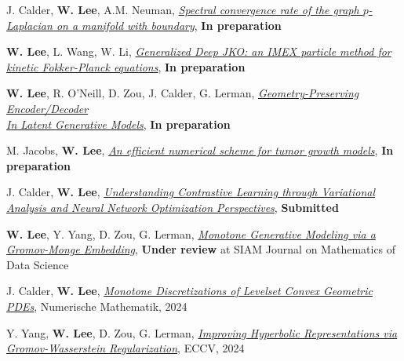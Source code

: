 

\begin{cvparagraph}

\vspace{0.5cm}
\begin{cvitems}
  \item J. Calder, \textbf{W. Lee}, A.M. Neuman, \href{}{\textit{Spectral convergence rate of the graph $p$-Laplacian on a manifold with boundary}}, \textbf{In preparation}
    \medskip
  \item \textbf{W. Lee}, L. Wang, W. Li, \href{}{\textit{Generalized Deep JKO: an IMEX particle method for kinetic Fokker-Planck equations}}, \textbf{In preparation}
  \medskip
  \item \textbf{W. Lee}, R. O'Neill, D. Zou, J. Calder, G. Lerman, \href{}{\textit{Geometry-Preserving Encoder/Decoder\\ In Latent Generative Models}}, \textbf{In preparation}
  \medskip
  \item M. Jacobs, \textbf{W. Lee}, \href{}{\textit{An efficient numerical scheme for tumor growth models}}, \textbf{In preparation}
    \medskip
  \item J. Calder, \textbf{W. Lee}, \href{}{\textit{Understanding Contrastive Learning through Variational Analysis and Neural Network Optimization Perspectives}}, \textbf{Submitted}
    \medskip
  \item \textbf{W. Lee}, Y. Yang, D. Zou, G. Lerman, \href{https://arxiv.org/abs/2311.01375}{\textit{Monotone Generative Modeling via a Gromov-Monge Embedding}}, {\bf Under review} at SIAM Journal on Mathematics of Data Science
    \medskip
  \item J. Calder, \textbf{W. Lee}, \href{https://arxiv.org/abs/2310.08450}{\textit{Monotone Discretizations of Levelset Convex Geometric PDEs}}, Numerische Mathematik, 2024
    \medskip
  \item Y. Yang, \textbf{W. Lee}, D. Zou, G. Lerman, \href{http://arxiv.org/abs/2407.10495}{\textit{Improving Hyperbolic Representations via Gromov-Wasserstein Regularization}}, ECCV, 2024

\end{cvitems}
\end{cvparagraph}
